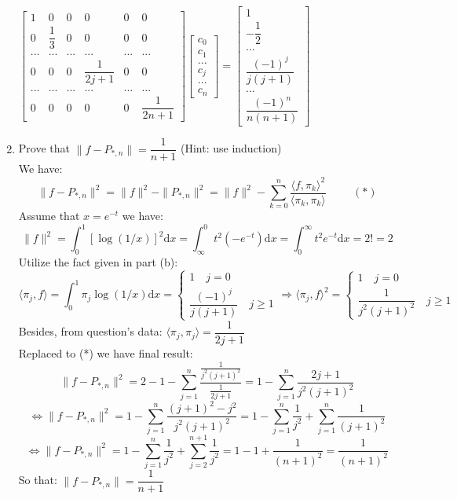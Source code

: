 \documentclass[14pt,a4paper]{article}
\begin{document}
\begin{enumerate}
	\hspace*{2cm} $\begin{bmatrix} 1&0&0&0&0&0 \\ 0& \dfrac{1}{3}&0&0&0&0 \\ ...&...&...&...&...&...\\0&0&0& \dfrac{1}{2j+1}&0&0\\...&...&...&...&...&...\\ 0&0&0&0&0& \dfrac{1}{2n+1}\end{bmatrix} \begin{bmatrix} c_0 \\ c_1 \\ ...\\c_j\\... \\c_n \end{bmatrix} = \begin{bmatrix} 1\\ -\dfrac{1}{2} \\ ...\\ \dfrac{(-1)^j}{j(j+1)}\\...\\\dfrac{(-1)^n}{n(n+1)} \end{bmatrix} $\\
	
	
	\label{3c}
	\item Prove that $\|f-P_{*,n}\| = \dfrac{1}{n+1}$ (Hint: use induction)\\
	We have: $$\|f-P_{*,n}\|^2 = \|f\|^2 - \|P_{*,n}\|^2 = \|f\|^2 - \sum_{k=0}^{n}\dfrac{\langle f,\pi_k\rangle^2}{\langle\pi_k,\pi_k\rangle} \hspace{1cm} (*)$$
	Assume that $x = e^{-t}$ we have:
	$$ \|f\|^2 = \int_{0}^{1}\left[\log(1/x)\right]^2\mathrm{d}x = \int_{\infty}^{0}t^2(-e^{-t})\mathrm{d}x = \int_{0}^{\infty}t^2e^{-t}\mathrm{d}x = 2! =2 $$
	Utilize the fact given in part (b):
	$$ \langle\pi_j,f\rangle =  \int_{0}^{1}\pi_j\log(1/x)\mathrm{d}x = \begin{cases} 1 \quad j = 0\\ \dfrac{(-1)^j}{j(j+1)} \quad j \geq 1 \end{cases} \Rightarrow \langle\pi_j,f\rangle^2 = \begin{cases} 1 \quad j = 0\\ \dfrac{1}{j^2(j+1)^2} \quad j \geq 1 \end{cases} $$
	Besides, from question's data: $ \langle\pi_j,\pi_j\rangle = \dfrac{1}{2j+1}$\\
	Replaced to (*) we have final result:
	$$\|f-P_{*,n}\|^2 = 2 - 1 - \sum_{j=1}^{n}\dfrac{\frac{1}{j^2(j+1)^2}}{\frac{1}{2j+1}} = 1 - \sum_{j=1}^{n}\dfrac{2j+1}{j^2(j+1)^2}$$
	$$ \Leftrightarrow \|f-P_{*,n}\|^2 = 1 - \sum_{j=1}^{n}\dfrac{(j+1)^2 - j^2}{j^2(j+1)^2} = 1 - \sum_{j=1}^{n}\dfrac{1}{j^2} + \sum_{j=1}^{n}\dfrac{1}{(j+1)^2} $$
	$$ \Leftrightarrow \|f-P_{*,n}\|^2 = 1 - \sum_{j=1}^{n}\dfrac{1}{j^2} + \sum_{j=2}^{n+1}\dfrac{1}{j^2} = 1 - 1 + \dfrac{1}{(n+1)^2} = \dfrac{1}{(n+1)^2}$$
	So that: $  \|f-P_{*,n}\| = \dfrac{1}{n+1}$
	\pagebreak
	

\end{enumerate}
\end{document}
